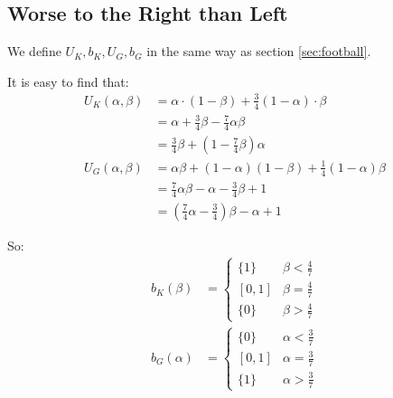 \documentclass{article}
\begin{document}
    \subsection{Worse to the Right than Left}

    We define $U_K, b_K, U_G, b_G$ in the same way as section \ref{sec:football}.

    It is easy to find that:
    \begin{align*}
    U_K(\alpha, \beta) &= \alpha\cdot(1-\beta)+\frac{3}{4}(1-\alpha)\cdot\beta\\
    &=\alpha+\frac{3}{4}\beta-\frac{7}{4}\alpha\beta\\
    &=\frac{3}{4}\beta+\left(1-\frac{7}{4}\beta\right)\alpha\\
    U_G(\alpha, \beta)&=\alpha\beta+(1-\alpha)(1-\beta)+\frac{1}{4}(1-\alpha)\beta\\
    &=\frac{7}{4}\alpha\beta-\alpha-\frac{3}{4}\beta+1\\
    &=\left(\frac{7}{4}\alpha-\frac{3}{4}\right)\beta-\alpha+1
    \end{align*}

    So:
    \begin{align*}
    b_K(\beta)&=\begin{cases}
        \{1\}&\beta<\frac{4}{7}\\
        [0, 1]&\beta=\frac{4}{7}\\
        \{0\}&\beta>\frac{4}{7}
    \end{cases}\\
    b_G(\alpha)&=\begin{cases}
        \{0\}&\alpha<\frac{3}{7}\\
        [0, 1]&\alpha=\frac{3}{7}\\
        \{1\}&\alpha>\frac{3}{7}
    \end{cases}
    \end{align*}
    
\end{document}
